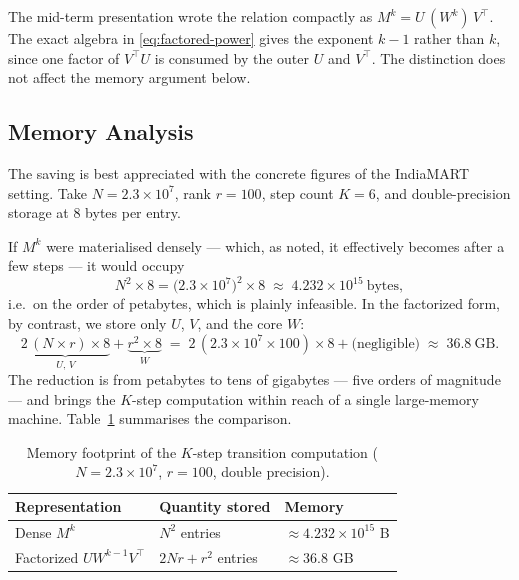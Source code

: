\begin{remark}
The mid-term presentation wrote the relation compactly as
$M^{k} = U\,(W^{k})\,V^{\top}$. The exact algebra in
\eqref{eq:factored-power} gives the exponent $k-1$ rather than $k$, since one
factor of $V^{\top}U$ is consumed by the outer $U$ and $V^{\top}$. The
distinction does not affect the memory argument below.
\end{remark}

\subsection{Memory Analysis}
\label{sec:mf-memory}
The saving is best appreciated with the concrete figures of the IndiaMART
setting. Take $N = 2.3 \times 10^{7}$, rank $r = 100$, step count $K = 6$, and
double-precision storage at $8$ bytes per entry.

If $M^{k}$ were materialised densely --- which, as noted, it effectively
becomes after a few steps --- it would occupy
\begin{equation}
  N^{2} \times 8
    = \bigl(2.3\times10^{7}\bigr)^{2}\times 8
    \;\approx\; 4.232 \times 10^{15}\ \text{bytes},
\end{equation}
i.e.\ on the order of petabytes, which is plainly infeasible. In the
factorized form, by contrast, we store only $U$, $V$, and the core $W$:
\begin{equation}
  \underbrace{2\,(N \times r)\times 8}_{U,\,V}
   + \underbrace{r^{2}\times 8}_{W}
    \;=\; 2\,(2.3\times10^{7}\times 100)\times 8 + \text{(negligible)}
    \;\approx\; 36.8\ \text{GB}.
\end{equation}
The reduction is from petabytes to tens of gigabytes --- five orders of
magnitude --- and brings the $K$-step computation within reach of a single
large-memory machine. Table~\ref{tab:mf-memory} summarises the comparison.

\begin{table}[ht]
  \centering
  \caption{Memory footprint of the $K$-step transition computation
           ($N=2.3\times10^{7}$, $r=100$, double precision).}
  \label{tab:mf-memory}
  \begin{tabular}{lll}
    \toprule
    Representation & Quantity stored & Memory \\
    \midrule
    Dense $M^{k}$            & $N^{2}$ entries          & $\approx 4.232\times10^{15}$ B \\
    Factorized $U W^{k-1}V^{\top}$ & $2Nr + r^{2}$ entries & $\approx 36.8$ GB \\
    \bottomrule
  \end{tabular}
\end{table}

